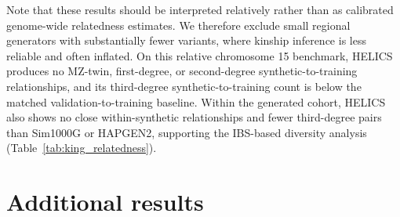 \documentclass{article}
\begin{document}
Note that these results should be interpreted relatively rather than as calibrated genome-wide relatedness estimates. We therefore exclude small regional generators with substantially fewer variants, where kinship inference is less reliable and often inflated. On this relative chromosome 15 benchmark, HELICS produces no MZ-twin, first-degree, or second-degree synthetic-to-training relationships, and its third-degree synthetic-to-training count is below the matched validation-to-training baseline. Within the generated cohort, HELICS also shows no close within-synthetic relationships and fewer third-degree pairs than Sim1000G or HAPGEN2, supporting the IBS-based diversity analysis (Table~\ref{tab:king_relatedness}).

\clearpage 
\section{Additional results}
\label{app:additional-res}
\end{document}
